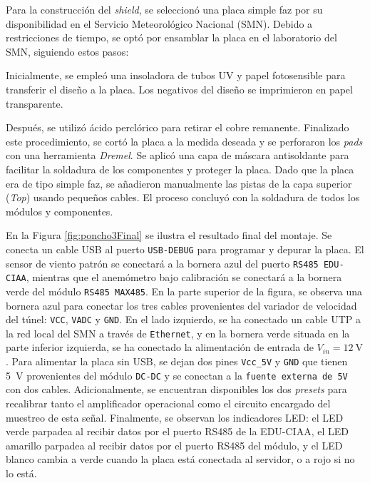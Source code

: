Para la construcción del \textit{shield}, se seleccionó una placa simple faz por su disponibilidad en el Servicio Meteorológico Nacional (SMN). Debido a restricciones de tiempo, se optó por ensamblar la placa en el laboratorio del SMN, siguiendo estos pasos:

Inicialmente, se empleó una insoladora de tubos UV y papel fotosensible para transferir el diseño a la placa. Los negativos del diseño se imprimieron en papel transparente.

Después, se utilizó ácido perclórico para retirar el cobre remanente. Finalizado este procedimiento, se cortó la placa a la medida deseada y se perforaron los \textit{pads} con una herramienta \textit{Dremel}. Se aplicó una capa de máscara antisoldante para facilitar la soldadura de los componentes y proteger la placa. Dado que la placa era de tipo simple faz, se añadieron manualmente las pistas de la capa superior (\textit{Top}) usando pequeños cables. El proceso concluyó con la soldadura de todos los módulos y componentes. 

En la Figura \ref{fig:poncho3Final} se ilustra el resultado final del montaje. Se conecta un cable USB al puerto \texttt{USB-DEBUG} para programar y depurar la placa. El sensor de viento patrón se conectará a la bornera azul del puerto \texttt{RS485 EDU-CIAA}, mientras que el anemómetro bajo calibración se conectará a la bornera verde del módulo \texttt{RS485 MAX485}. En la parte superior de la figura, se observa una bornera azul para conectar los tres cables provenientes del variador de velocidad del túnel: \texttt{VCC}, \texttt{VADC} y \texttt{GND}. En el lado izquierdo, se ha conectado un cable UTP a la red local del SMN a través de \texttt{Ethernet}, y en la bornera verde situada en la parte inferior izquierda, se ha conectado la alimentación de entrada de $V_{in} = \SI{12}{\volt}$. Para alimentar la placa sin USB, se dejan dos pines \texttt{Vcc\_5V} y \texttt{GND} que tienen \SI{5}{\volt} provenientes del módulo \texttt{DC-DC} y se conectan a la \texttt{fuente externa de 5V} con dos cables. Adicionalmente, se encuentran disponibles los dos \textit{presets} para recalibrar tanto el amplificador operacional como el circuito encargado del muestreo de esta señal. Finalmente, se observan los indicadores LED: el LED verde parpadea al recibir datos por el puerto RS485 de la EDU-CIAA, el LED amarillo parpadea al recibir datos por el puerto RS485 del módulo, y el LED blanco cambia a verde cuando la placa está conectada al servidor, o a rojo si no lo está.



